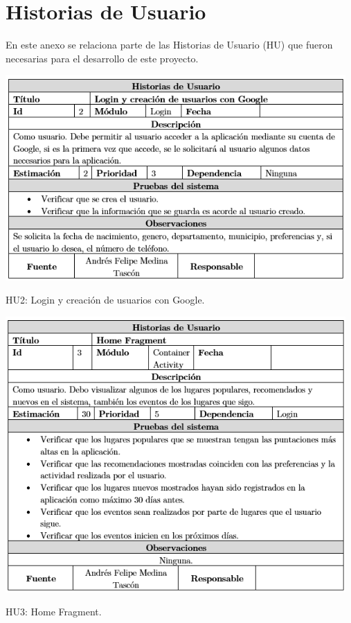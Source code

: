 \documentclass[12pt,letterpaper,openany]{book}
\begin{document}
\appendix
\chapter{Historias de Usuario}\label{aped.A}
En este anexo se relaciona parte de las Historias de Usuario (HU) que fueron necesarias para el desarrollo de este proyecto.	
\begin{table}[H]
\centering
\includegraphics[width=13cm]{./imagenes/HU/HU2}
\caption{HU2: Login y creación de usuarios con Google.}
\end{table}

\begin{table}[H]
\centering
\includegraphics[width=13cm]{./imagenes/HU/HU3}
\caption{HU3: Home Fragment.}
\end{table}
\end{document}
